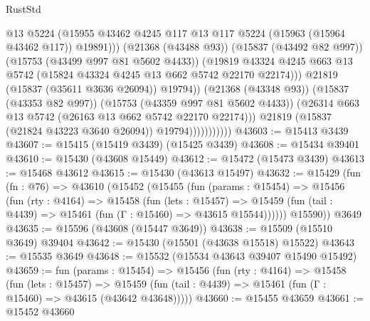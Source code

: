 \begin{lexlean}{RustStd}
\begin{coremodule}
                                      @13
                                      @5224
                                      (@15955
                                        @43462
                                        @4245
                                        @117
                                        @13
                                        @117
                                        @5224
                                        (@15963 (@15964 @43462 @117))
                                        @19891)))
                                  (@21368 (@43488 @93))
                                  (@15837 (@43492 @82 @997))
                                  (@15753 (@43499 @997 @81 @5602 @4433))
                                  (@19819
                                    @43324
                                    @4245
                                    @663
                                    @13
                                    @5742
                                    (@15824 @43324 @4245 @13 @662 @5742 @22170 @22174)))
                                @21819
                                (@15837 (@35611 @3636 @26094))
                                @19794))
                            (@21368 (@43348 @93))
                            (@15837 (@43353 @82 @997))
                            (@15753 (@43359 @997 @81 @5602 @4433))
                            (@26314 @663 @13 @5742 (@26163 @13 @662 @5742 @22170 @22174)))
                          @21819
                          (@15837 (@21824 @43223 @3640 @26094))
                          @19794)))))))))))
@43603 := @15413 @3439
@43607 := @15415 (@15419 @3439) (@15425 @3439)
@43608 := @15434 @39401
@43610 := @15430 (@43608 @15449)
@43612 := @15472 (@15473 @3439)
@43613 := @15468 @43612
@43615 := @15430 (@43613 @15497)
@43632 := @15429
    (fun (fn : @76) =>
    @43610
      (@15452
        (@15455
          (fun (params : @15454) =>
          @15456
            (fun (rty : @4164) =>
            @15458
              (fun (lets : @15457) =>
              @15459 (fun (tail : @4439) => @15461 (fun (Γ : @15460) => @43615 @15544))))))
        @15590))
    @3649
@43635 := @15596 (@43608 (@15447 @3649))
@43638 := @15509 (@15510 @3649) @39404
@43642 := @15430 (@15501 (@43638 @15518) @15522)
@43643 := @15535 @3649
@43648 := @15532 (@15534 @43643 @39407 @15490 @15492)
@43659 := fun (params : @15454) =>
  @15456
    (fun (rty : @4164) =>
    @15458
      (fun (lets : @15457) =>
      @15459 (fun (tail : @4439) => @15461 (fun (Γ : @15460) => @43615 (@43642 @43648)))))
@43660 := @15455 @43659
@43661 := @15452 @43660

\end{coremodule}
\end{lexlean}
